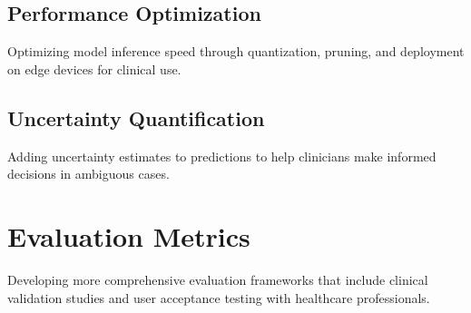 \documentclass[12pt,a4paper,oneside]{report}
\begin{document}
\subsection{Performance Optimization}
Optimizing model inference speed through quantization, pruning, and deployment on edge devices for clinical use.

\subsection{Uncertainty Quantification}
Adding uncertainty estimates to predictions to help clinicians make informed decisions in ambiguous cases.

\section{Evaluation Metrics}

Developing more comprehensive evaluation frameworks that include clinical validation studies and user acceptance testing with healthcare professionals.

\end{document}
